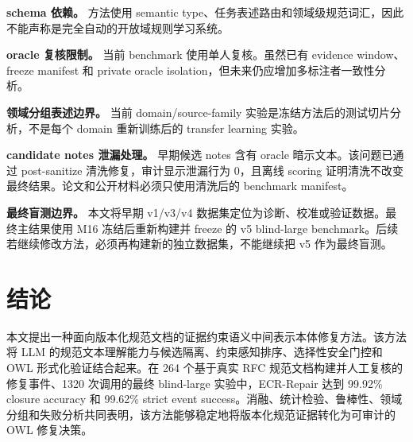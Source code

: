 \documentclass[11pt]{article}
\begin{document}
\textbf{schema 依赖。} 方法使用 semantic type、任务表述路由和领域级规范词汇，因此不能声称是完全自动的开放域规则学习系统。

\textbf{oracle 复核限制。} 当前 benchmark 使用单人复核。虽然已有 evidence window、freeze manifest 和 private oracle isolation，但未来仍应增加多标注者一致性分析。

\textbf{领域分组表述边界。} 当前 domain/source-family 实验是冻结方法后的测试切片分析，不是每个 domain 重新训练后的 transfer learning 实验。

\textbf{candidate notes 泄漏处理。} 早期候选 notes 含有 oracle 暗示文本。该问题已通过 post-sanitize 清洗修复，审计显示泄漏行为 0，且离线 scoring 证明清洗不改变最终结果。论文和公开材料必须只使用清洗后的 benchmark manifest。

\textbf{最终盲测边界。} 本文将早期 v1/v3/v4 数据集定位为诊断、校准或验证数据。最终主结果使用 M16 冻结后重新构建并 freeze 的 v5 blind-large benchmark。后续若继续修改方法，必须再构建新的独立数据集，不能继续把 v5 作为最终盲测。

\section{结论}

本文提出一种面向版本化规范文档的证据约束语义中间表示本体修复方法。该方法将 LLM 的规范文本理解能力与候选隔离、约束感知排序、选择性安全门控和 OWL 形式化验证结合起来。在 264 个基于真实 RFC 规范文档构建并人工复核的修复事件、1320 次调用的最终 blind-large 实验中，ECR-Repair 达到 99.92\% closure accuracy 和 99.62\% strict event success。消融、统计检验、鲁棒性、领域分组和失败分析共同表明，该方法能够稳定地将版本化规范证据转化为可审计的 OWL 修复决策。



\end{document}
